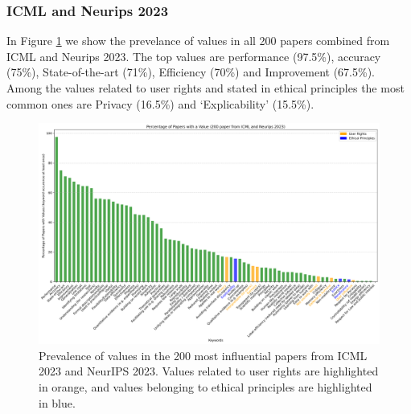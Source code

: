 \documentclass{article}
\begin{document}
\subsubsection{ICML and Neurips 2023}
In Figure \ref{fig:percentage_both_conferences} we show the prevelance of values in all 200 papers combined from ICML and Neurips 2023. The top values are performance (97.5\%), accuracy (75\%), 
State-of-the-art (71\%), Efficiency (70\%) and Improvement (67.5\%). Among the values related to user rights and stated in 
ethical principles the most common ones are Privacy (16.5\%) and `Explicability' (15.5\%). 

\begin{figure}[H]
    \centering
    \includegraphics[width=\textwidth]{../plots/percentage_both_conferences.png}
    \caption{Prevalence of values in the 200 most influential papers from ICML 2023 and NeurIPS 2023. Values related to user rights are highlighted in orange, and values belonging to ethical principles are highlighted in blue.}
    \label{fig:percentage_both_conferences}
\end{figure}
\end{document}
